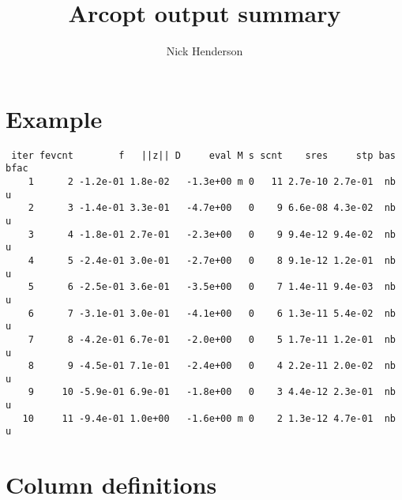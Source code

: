 \documentclass[11pt]{article}
\title{Arcopt output summary}
\author{Nick Henderson}
\begin{document}
\maketitle

\section{Example}

\begin{verbatim}
 iter fevcnt        f   ||z|| D     eval M s scnt    sres     stp bas bfac
    1      2 -1.2e-01 1.8e-02   -1.3e+00 m 0   11 2.7e-10 2.7e-01  nb u
    2      3 -1.4e-01 3.3e-01   -4.7e+00   0    9 6.6e-08 4.3e-02  nb u
    3      4 -1.8e-01 2.7e-01   -2.3e+00   0    9 9.4e-12 9.4e-02  nb u
    4      5 -2.4e-01 3.0e-01   -2.7e+00   0    8 9.1e-12 1.2e-01  nb u
    5      6 -2.5e-01 3.6e-01   -3.5e+00   0    7 1.4e-11 9.4e-03  nb u
    6      7 -3.1e-01 3.0e-01   -4.1e+00   0    6 1.3e-11 5.4e-02  nb u
    7      8 -4.2e-01 6.7e-01   -2.0e+00   0    5 1.7e-11 1.2e-01  nb u
    8      9 -4.5e-01 7.1e-01   -2.4e+00   0    4 2.2e-11 2.0e-02  nb u
    9     10 -5.9e-01 6.9e-01   -1.8e+00   0    3 4.4e-12 2.3e-01  nb u
   10     11 -9.4e-01 1.0e+00   -1.6e+00 m 0    2 1.3e-12 4.7e-01  nb u
\end{verbatim}

\section{Column definitions}
\end{document}
